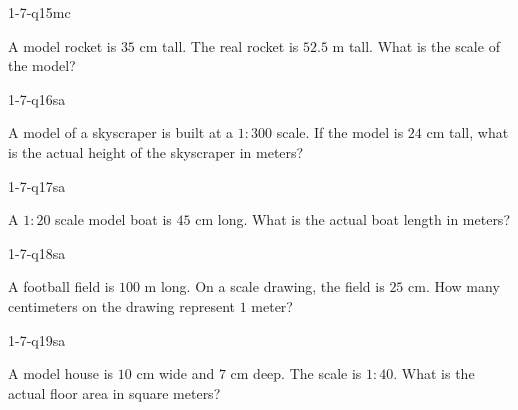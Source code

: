 \begin{practiceQuestion}{1-7-q15}{mc}
\begin{questionText}
A model rocket is $35$ cm tall. The real rocket is $52.5$ m tall. What is the scale of the model?
\end{questionText}
\end{practiceQuestion}


\begin{practiceQuestion}{1-7-q16}{sa}
\begin{questionText}
A model of a skyscraper is built at a $1 : 300$ scale. If the model is $24$ cm tall, what is the actual height of the skyscraper in meters?
\end{questionText}
\end{practiceQuestion}

\begin{practiceQuestion}{1-7-q17}{sa}
\begin{questionText}
A $1 : 20$ scale model boat is $45$ cm long. What is the actual boat length in meters?
\end{questionText}
\end{practiceQuestion}

\begin{practiceQuestion}{1-7-q18}{sa}
\begin{questionText}
A football field is $100$ m long. On a scale drawing, the field is $25$ cm. How many centimeters on the drawing represent $1$ meter?
\end{questionText}
\end{practiceQuestion}

\begin{practiceQuestion}{1-7-q19}{sa}
\begin{questionText}
A model house is $10$ cm wide and $7$ cm deep. The scale is $1 : 40$. What is the actual floor area in square meters?
\end{questionText}
\end{practiceQuestion}

